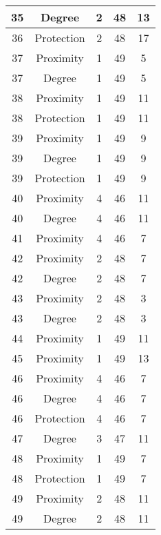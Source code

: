 \documentclass[results.tex]{subfiles}
\begin{document}
\begin{center}
\begin{tabular}{| c || c | c | c | c |}
    \hline
    35 & Degree & 2 & 48 & 13 \\ 
    \hline
    36 & Protection & 2 & 48 & 17 \\ 
    \hline
    37 & Proximity & 1 & 49 & 5 \\ 
    \hline
    37 & Degree & 1 & 49 & 5 \\ 
    \hline
    38 & Proximity & 1 & 49 & 11 \\ 
    \hline
    38 & Protection & 1 & 49 & 11 \\ 
    \hline
    39 & Proximity & 1 & 49 & 9 \\ 
    \hline
    39 & Degree & 1 & 49 & 9 \\ 
    \hline
    39 & Protection & 1 & 49 & 9 \\ 
    \hline
    40 & Proximity & 4 & 46 & 11 \\ 
    \hline
    40 & Degree & 4 & 46 & 11 \\ 
    \hline
    41 & Proximity & 4 & 46 & 7 \\ 
    \hline
    42 & Proximity & 2 & 48 & 7 \\ 
    \hline
    42 & Degree & 2 & 48 & 7 \\ 
    \hline
    43 & Proximity & 2 & 48 & 3 \\ 
    \hline
    43 & Degree & 2 & 48 & 3 \\ 
    \hline
    44 & Proximity & 1 & 49 & 11 \\ 
    \hline
    45 & Proximity & 1 & 49 & 13 \\ 
    \hline
    46 & Proximity & 4 & 46 & 7 \\ 
    \hline
    46 & Degree & 4 & 46 & 7 \\ 
    \hline
    46 & Protection & 4 & 46 & 7 \\ 
    \hline
    47 & Degree & 3 & 47 & 11 \\ 
    \hline
    48 & Proximity & 1 & 49 & 7 \\ 
    \hline
    48 & Protection & 1 & 49 & 7 \\ 
    \hline
    49 & Proximity & 2 & 48 & 11 \\ 
    \hline
    49 & Degree & 2 & 48 & 11 \\ 
    \hline   \end{tabular}
\end{center}
\end{document}
